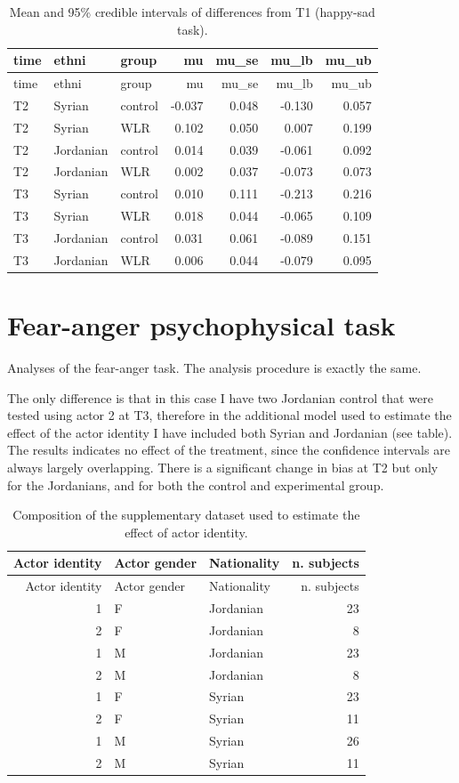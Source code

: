 \documentclass[]{article}
\begin{document}
\begin{longtable}[]{@{}lllrrrr@{}}
\caption{Mean and 95\% credible intervals of differences from T1
(happy-sad task).}\tabularnewline
\toprule
time & ethni & group & mu & mu\_se & mu\_lb & mu\_ub\tabularnewline
\midrule
\endfirsthead
\toprule
time & ethni & group & mu & mu\_se & mu\_lb & mu\_ub\tabularnewline
\midrule
\endhead
T2 & Syrian & control & -0.037 & 0.048 & -0.130 & 0.057\tabularnewline
T2 & Syrian & WLR & 0.102 & 0.050 & 0.007 & 0.199\tabularnewline
T2 & Jordanian & control & 0.014 & 0.039 & -0.061 & 0.092\tabularnewline
T2 & Jordanian & WLR & 0.002 & 0.037 & -0.073 & 0.073\tabularnewline
T3 & Syrian & control & 0.010 & 0.111 & -0.213 & 0.216\tabularnewline
T3 & Syrian & WLR & 0.018 & 0.044 & -0.065 & 0.109\tabularnewline
T3 & Jordanian & control & 0.031 & 0.061 & -0.089 & 0.151\tabularnewline
T3 & Jordanian & WLR & 0.006 & 0.044 & -0.079 & 0.095\tabularnewline
\bottomrule
\end{longtable}

\newpage

\hypertarget{fear-anger-psychophysical-task}{%
\section{Fear-anger psychophysical
task}\label{fear-anger-psychophysical-task}}

Analyses of the fear-anger task. The analysis procedure is exactly the
same.

The only difference is that in this case I have two Jordanian control
that were tested using actor 2 at T3, therefore in the additional model
used to estimate the effect of the actor identity I have included both
Syrian and Jordanian (see table). The results indicates no effect of the
treatment, since the confidence intervals are always largely
overlapping. There is a significant change in bias at T2 but only for
the Jordanians, and for both the control and experimental group.

\begin{longtable}[]{@{}rllr@{}}
\caption{Composition of the supplementary dataset used to estimate the
effect of actor identity.}\tabularnewline
\toprule
Actor identity & Actor gender & Nationality & n. subjects\tabularnewline
\midrule
\endfirsthead
\toprule
Actor identity & Actor gender & Nationality & n. subjects\tabularnewline
\midrule
\endhead
1 & F & Jordanian & 23\tabularnewline
2 & F & Jordanian & 8\tabularnewline
1 & M & Jordanian & 23\tabularnewline
2 & M & Jordanian & 8\tabularnewline
1 & F & Syrian & 23\tabularnewline
2 & F & Syrian & 11\tabularnewline
1 & M & Syrian & 26\tabularnewline
2 & M & Syrian & 11\tabularnewline
\bottomrule
\end{longtable}
\end{document}
